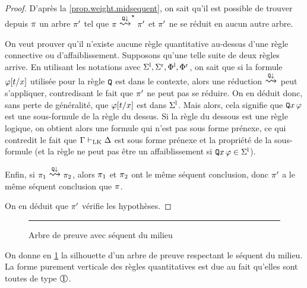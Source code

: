 \begin{proof}
  D'après la \cref{prop.weight.midsequent}, on sait qu'il est possible de
  trouver depuis $\pi$ un arbre $\pi'$ tel que
  $\varPT\rtClot{\reecr{\quantif\downarrow}} \varPT'$ et $\pi'$ ne se
  réduit en aucun autre arbre.

  On veut prouver qu'il n'existe aucune règle quantitative au-dessus d'une
  règle connective ou d'affaiblissement. Supposons qu'une telle suite de deux
  règles arrive. En utilisant les notations avec
  $\Sigma^{\mathrm{l}},\Sigma^{\mathrm{r}},\Phi^{\mathrm{l}},\Phi^{\mathrm{r}}$, on sait que si
  la formule $\varphi[t/x]$ utilisée pour la règle ${\normalfont\texttt{Q}}$ est dans
  le contexte, alors une réduction $\reecr{\quantif\downarrow}$ peut
  s'appliquer, contredisant le fait que $\pi'$ ne peut pas se réduire.
  On en déduit donc, sans perte de généralité, que $\varphi[t/x]$ est dans
  $\Sigma^{\mathrm{l}}$. Mais alors, cela signifie que ${\normalfont\texttt{Q}} x\,\varphi$ est une
  sous-formule de la règle du dessus. Si la règle du dessous est une règle
  logique, on obtient alors une formule qui n'est pas sous forme prénexe, ce
  qui contredit le fait que $\Gamma\vdash_{\operatorname{LK}}\Delta$ est sous forme prénexe et la
  propriété de la sous-formule (et la règle ne peut pas être un affaiblissement
  si ${\normalfont\texttt{Q}} x\,\varphi \in \Sigma^{\mathrm{l}}$).

  Enfin, si $\varPT_1\reecr{\quantif\downarrow} \varPT_2$, alors $\pi_1$ et
  $\pi_2$ ont le même séquent conclusion, donc $\pi'$ a le même séquent
  conclusion que $\pi$.

  On en déduit que $\pi'$ vérifie les hypothèses.
\end{proof}

\begin{figure}[t]
  \centering

  \vspace{0.2cm}
  \hrule

  \vspace{0.2cm}
  \caption{Arbre de preuve avec séquent du milieu}
  \label{fig.midsequent}
\end{figure}

On donne en \cref{fig.midsequent} la silhouette d'un arbre de preuve respectant
le séquent du milieu. La forme purement verticale des règles quantitatives est
due au fait qu'elles sont toutes de type $\rOne$.

